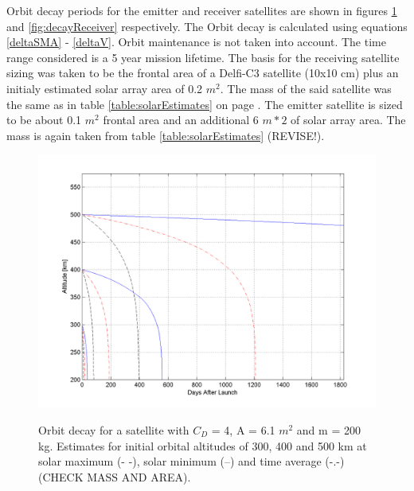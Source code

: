 Orbit decay periods for the emitter and receiver satellites are shown in figures \ref{fig:decayEmitter} and \ref{fig:decayReceiver} respectively. The Orbit decay is calculated using equations \ref{deltaSMA} - \ref{deltaV}. Orbit maintenance is not taken into account. The time range considered is a 5 year mission lifetime. The basis for the receiving satellite sizing was taken to be the frontal area of a Delfi-C3 satellite (10x10 cm) plus an initialy estimated solar array area of 0.2 $m^2$. The mass of the said satellite was the same as in table \ref{table:solarEstimates} on page \pageref{table:solarEstimates}. The emitter satellite is sized to be about 0.1 $m^2$ frontal area and an additional 6 $m*2$ of solar array area. The mass is again taken from table \ref{table:solarEstimates} (REVISE!).

\begin{figure}[h!]
\centering
\includegraphics[width=0.95\textheight, angle=90]{img/orbitDecayEmitter.png}
\label{fig:decayEmitter}
\caption{Orbit decay for a satellite with $C_D$ = 4, A = 6.1 $m^2$ and m = 200 kg. Estimates for initial orbital altitudes of 300, 400 and 500 km at solar maximum (- -), solar minimum (--) and time average (-.-) (CHECK MASS AND AREA).}
\end{figure}

